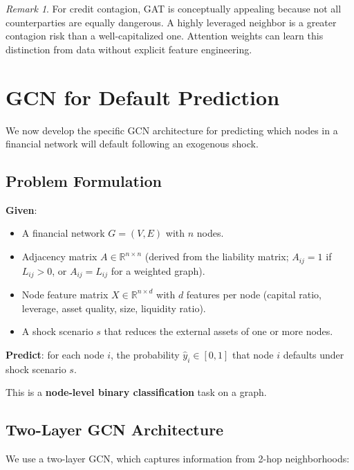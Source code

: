 \documentclass[11pt, a4paper]{article}
\theoremstyle{definition}
\theoremstyle{plain}
\theoremstyle{remark}
\newtheorem{remark}{Remark}[section]
\newcommand{\RV}{\mathbb{R}}
\begin{document}
\begin{remark}
For credit contagion, GAT is conceptually appealing because not all counterparties
are equally dangerous.
A highly leveraged neighbor is a greater contagion risk than a well-capitalized one.
Attention weights can learn this distinction from data without explicit feature
engineering.
\end{remark}

\section{GCN for Default Prediction}
\label{sec:gcn-default}

We now develop the specific GCN architecture for predicting which nodes in a
financial network will default following an exogenous shock.

\subsection{Problem Formulation}

\textbf{Given}:
\begin{itemize}
    \item A financial network $G = (V, E)$ with $n$ nodes.
    \item Adjacency matrix $A \in \RV^{n \times n}$ (derived from the liability matrix;
          $A_{ij} = 1$ if $L_{ij} > 0$, or $A_{ij} = L_{ij}$ for a weighted graph).
    \item Node feature matrix $X \in \RV^{n \times d}$ with $d$ features per node
          (capital ratio, leverage, asset quality, size, liquidity ratio).
    \item A shock scenario $s$ that reduces the external assets of one or more nodes.
\end{itemize}

\textbf{Predict}: for each node $i$, the probability $\hat{y}_i \in [0, 1]$ that
node $i$ defaults under shock scenario $s$.

This is a \textbf{node-level binary classification} task on a graph.

\subsection{Two-Layer GCN Architecture}

We use a two-layer GCN, which captures information from 2-hop neighborhoods:
\end{document}
